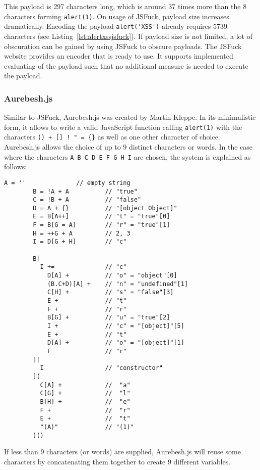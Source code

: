 This payload is 297 characters long, which is around 37 times more than the 8 characters forming \verb|alert(1)|. On usage of JSFuck, payload size increases dramatically. Encoding the payload \verb|alert('XSS')| already requires 5739 characters (see Listing~\ref{lst:alertxssjsfuck}). If payload size is not limited, a lot of obscuration can be gained by using JSFuck to obscure payloads. The JSFuck website provides an encoder that is ready to use. It supports implemented evaluating of the payload such that no additional measure is needed to execute the payload. \cite{mk/jsfuck}


\subsubsection{Aurebesh.js}
\label{sec:aurebesh}
Similar to JSFuck, Aurebesh.js was created by Martin Kleppe. In its minimalistic form, it allows to write a valid JavaScript function calling \verb|alert(1)| with the characters \verb|() + [] ! " = {}| as well as one other character of choice. Aurebesh.js allows the choice of up to 9 distinct characters or words. In the case where the characters \verb|A B C D E F G H I| are chosen, the system is explained as follows:
\begin{lstlisting}[style=basicStyle, caption=Aurebesh.js explanation \cite{mk/aurebesh}, label={lst:aurebeshexplanation}]
		A = ''              // empty string
		B = !A + A          // "true"
		C = !B + A          // "false"
		D = A + {}          // "[object Object]"
		E = B[A++]          // "t" = "true"[0]
		F = B[G = A]        // "r" = "true"[1]
		H = ++G + A         // 2, 3
		I = D[G + H]        // "c"

		B[
		  I +=              // "c"
		    D[A] +          // "o" = "object"[0]
		    (B.C+D)[A] +    // "n" = "undefined"[1]
		    C[H] +          // "s" = "false"[3]
		    E +             // "t"
		    F +             // "r"
		    B[G] +          // "u" = "true"[2]
		    I +             // "c" = "[object]"[5]
		    E +             // "t"
		    D[A] +          // "o" = "[object]"[1]
		    F               // "r"
		][
		  I                 // "constructor"
		](
		  C[A] +            //  "a"
		  C[G] +            //  "l"
		  B[H] +            //  "e"
		  F +               //  "r"
		  E +               //  "t"
		  "(A)"             // "(1)"
		)()
\end{lstlisting}
If less than 9 characters (or words) are supplied, Aurebesh.js will reuse some characters by concatenating them together to create 9 different variables. \cite{mk/aurebesh}

